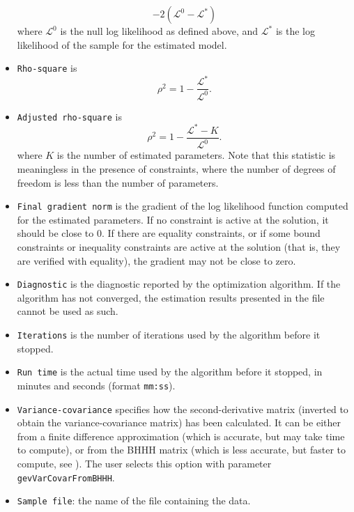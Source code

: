 \documentclass[12pt,a4paper]{article}
\begin{document}
\begin{itemize}
         \begin{equation}
            -2 ( \mathcal{L}^0 - \mathcal{L}^*)
         \end{equation}
         where 
         $ \mathcal{L}^0$ is the null log likelihood as defined above, and $\mathcal{L}^*$ is the log likelihood of the sample for the estimated model. 
      \item \lstinline+Rho-square+ is
         \begin{equation}
            \rho^2 = 1 - \frac{\mathcal{L}^*}{\mathcal{L}^0}.
         \end{equation}
        \item \lstinline+Adjusted rho-square+ is
         \begin{equation}
            \rho^2 = 1 - \frac{\mathcal{L}^* - K}{\mathcal{L}^0}.
         \end{equation}
         where $K$ is the number of estimated parameters. Note that this statistic is meaningless in the presence of constraints, where the number of degrees of freedom is less than  the number of parameters. 
      \item \lstinline+Final gradient norm+ is the gradient of the log
        likelihood function computed for the estimated parameters. If
        no constraint is active at the solution, it should be close to
        0. If there are equality constraints, or if some bound
        constraints or inequality constraints are active at the
        solution (that is, they are verified with equality), the
        gradient may not be close to zero.
\item \lstinline+Diagnostic+ is the diagnostic reported by the optimization
algorithm. If the algorithm has not converged, the estimation results presented
in the file cannot be used as such. 
\item \lstinline+Iterations+ is the number of iterations used by the
algorithm before it stopped. 
\item \lstinline+Run time+ is the actual time used by the algorithm before
it stopped, in minutes and seconds (format \texttt{mm:ss}).
   \item \lstinline+Variance-covariance+ specifies how the second-derivative matrix (inverted to obtain the variance-covariance matrix) has been calculated. It can be either from a finite difference approximation  (which is accurate, but may take time to compute), or from the BHHH matrix (which is less accurate, but faster to compute, see
         \cite{BernHallHallHaus74}). The user selects this option with
         parameter \texttt{gevVarCovarFromBHHH}.
\item \lstinline+Sample file+: the name of the file containing the data.
   \end{itemize}
\end{document}
